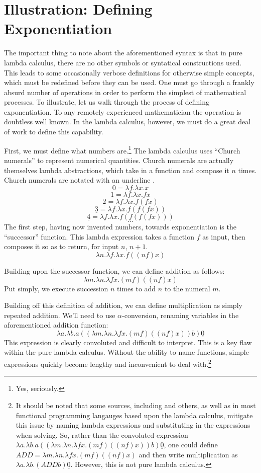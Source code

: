 \documentclass[twocolumn,titlepage,12pt]{article}
\begin{document}
\section{Illustration: Defining Exponentiation}
The important thing to note about the aforementioned syntax is that in pure lambda calculus, there are no other symbols or syntatical constructions used. This leads to some occasionally verbose definitions for otherwise simple concepts, which must be redefined before they can be used. One must go through a frankly absurd number of operations in order to perform the simplest of mathematical processes. To illustrate, let us walk through the process of defining exponentiation. To any remotely experienced mathematician the operation is doubtless well known. In the lambda calculus, however, we must do a great deal of work to define this capability.

First, we must define what numbers are.\footnote{Yes, seriously.} The lambda calculus uses ``Church numerals'' to represent numerical quantities. Church numerals are actually themselves lambda abstractions, which take in a function and compose it $n$ times. Church numerals are notated with an underline \cite{cornelllc}.
$$\underline{0}=\lambda f.\lambda x.x$$
$$\underline{1}=\lambda f.\lambda x.fx$$
$$\underline{2}=\lambda f.\lambda x.f(fx)$$
$$\underline{3}=\lambda f.\lambda x.f(f(fx))$$
$$\underline{4}=\lambda f.\lambda x.f(f(f(fx)))$$
$$...$$
The first step, having now invented numbers, towards exponentiation is the ``successor'' function. This lambda expression takes a function $f$ as input, then composes it so as to return, for input $n$, $n+1$.
$$\lambda n.\lambda f.\lambda x.f((n f) x)$$

Building upon the successor function, we can define addition as follows:
$$\lambda m.\lambda n.\lambda fx.(m f) ((n f) x)$$
Put simply, we execute succession $n$ times to add $n$ to the numeral $m$.

Building off this definition of addition, we can define multiplication as simply repeated addition. We'll need to use $\alpha$-conversion, renaming variables in the aforementioned addition function:
$$\lambda a.\lambda b.a ((\lambda m.\lambda n.\lambda fx.(m f) ((n f) x)) b) \underline{0}$$
This expression is clearly convoluted and difficult to interpret. This is a key flaw within the pure lambda calculus. Without the ability to name functions, simple expressions quickly become lengthy and inconvenient to deal with.\footnote{It should be noted that some sources, including \cite{cornellc}\cite{rojastutorial} and others, as well as in most functional programming langauges based upon the lambda calculus, mitigate this issue by naming lambda expressions and substituting in the expressions when solving. So, rather than the convoluted expression $\lambda a.\lambda b.a ((\lambda m.\lambda n.\lambda fx.(m f) ((n f) x)) b) \underline{0}$, one could define $ADD=\lambda m.\lambda n.\lambda fx.(m f) ((n f) x)$ and then write multiplication as $\lambda a.\lambda b.(ADD b) \underline{0}$. However, this is not pure lambda calculus.}
\end{document}
